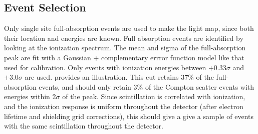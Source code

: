\documentclass[herrin-thesis.tex]{subfiles}
\begin{document}
\subsection{Event Selection}
Only single site full-absorption events are used to make the light map, since both their location and energies are known. Full absorption events are identified by looking at the ionization spectrum. The mean and sigma of the full-absorption peak are fit with a Gaussian + complementary errror function model like that used for calibration. Only events with ionization energies between \(+0.33\sigma\) and \(+3.0\sigma\) are used.  provides an illustration. This cut retains 37\% of the full-absorption events, and should only retain 3\% of the Compton scatter events with energies within 2\(\sigma\) of the peak. Since scintillation is correlated with ionization, and the ionization response is uniform throughout the detector (after electron lifetime and shielding grid corrections), this should give a give a sample of events with the same scintillation throughout the detector.
\end{document}
